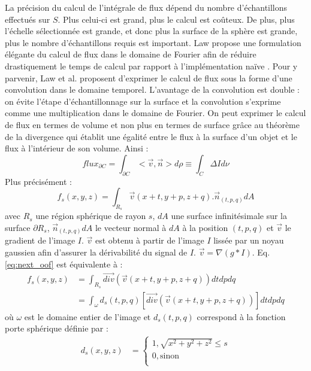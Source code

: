   La précision du calcul de l'intégrale de flux dépend du nombre d'échantillons effectués sur $S$. Plus celui-ci est grand, plus le calcul est coûteux. De plus, plus l'échelle sélectionnée est grande, et donc plus la surface de la sphère est grande, plus le nombre d'échantillons requis est important. Law propose une formulation élégante du calcul de flux dans le domaine de Fourier afin de réduire drastiquement le temps de calcul par rapport à l'implémentation naïve \cite{Law2009_efficient_implementation}.
  Pour y parvenir, Law et al. proposent d'exprimer le calcul de flux sous la forme d'une convolution dans le domaine temporel. L'avantage de la convolution est double : on évite l'étape d'échantillonnage sur la surface et la convolution s'exprime comme une multiplication dans le domaine de Fourier. On peut exprimer le calcul de flux en termes de volume et non plus en termes de surface grâce au théorème de la divergence qui établit une égalité entre le flux à la surface d'un objet et le flux à l'intérieur de son volume. Ainsi :
  \begin{equation}
    flux_{\partial C} = \int_{\partial C}< \vec{v},\vec{n} > d\rho \equiv \int_{C }\Delta I d\nu
  \end{equation}
  Plus précisément :
  \begin{equation}
    f_s(x,y,z) = \int_{R_s}\vec{v}(x+t,y+p, z+q) . \vec{n}_{(t,p,q)}dA
    \label{eq:next_oof}
  \end{equation}
  avec $R_s$ une région sphérique de rayon $s$, $dA$ une surface infinitésimale sur la surface $\partial R_s$, $\vec{n}_{(t,p,q)}dA$ le vecteur normal à $dA$ à la position $(t,p,q)$ et $\vec{v}$ le gradient de l'image $I$. $\vec{v}$ est obtenu à partir de l'image $I$ lissée par un noyau gaussien afin d'assurer la dérivabilité du signal de $I$. $\vec{v}=\nabla(g*I)$.
  Eq. \ref{eq:next_oof} est équivalente à :
  \begin{align}
    f_s(x,y,z) & = \int_{R_s} \vec{div}( \vec{v}(x+t,y+p, z+q) ) dtdpdq \\
    & = \int_{\omega} d_s(t,p,q) [\vec{div}( \vec{v}(x+t,y+p, z+q) )] dtdpdq
  \end{align}
  où $\omega$ est le domaine entier de l'image et $d_s(t,p,q)$ correspond à la fonction porte sphérique définie par :
  \begin{align}
    d_s(x,y,z) & = \begin{cases} 
                  1, \sqrt{x^2 + y^2 + z^2} \leq s  \\
                  0, \text{sinon} \\
                \end{cases}
  \end{align}
